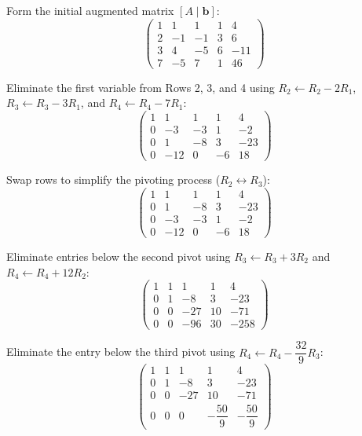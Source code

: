 \documentclass[12pt,a3paper]{article}
\begin{document}
\begin{tcolorbox}[enhanced,breakable,
  colback=cB!4,colframe=cB,boxrule=0.8pt,arc=5pt,
  title={\textbf{Answer --- Solve System via Augmented Matrix}},
  fonttitle=\bfseries\color{white},colbacktitle=cB]

Form the initial augmented matrix $[A \mid \mathbf{b}]$:
\[
\left(\begin{array}{rrrr|r}
1 & 1 & 1 & 1 & 4\\
2 & -1 & -1 & 3 & 6\\
3 & 4 & -5 & 6 & -11\\
7 & -5 & 7 & 1 & 46
\end{array}\right)
\]

Eliminate the first variable from Rows 2, 3, and 4 using $R_2 \leftarrow R_2 - 2R_1$, $R_3 \leftarrow R_3 - 3R_1$, and $R_4 \leftarrow R_4 - 7R_1$:
\[
\left(\begin{array}{rrrr|r}
1 & 1 & 1 & 1 & 4\\
0 & -3 & -3 & 1 & -2\\
0 & 1 & -8 & 3 & -23\\
0 & -12 & 0 & -6 & 18
\end{array}\right)
\]

Swap rows to simplify the pivoting process ($R_2 \leftrightarrow R_3$):
\[
\left(\begin{array}{rrrr|r}
1 & 1 & 1 & 1 & 4\\
0 & 1 & -8 & 3 & -23\\
0 & -3 & -3 & 1 & -2\\
0 & -12 & 0 & -6 & 18
\end{array}\right)
\]

Eliminate entries below the second pivot using $R_3 \leftarrow R_3 + 3R_2$ and $R_4 \leftarrow R_4 + 12R_2$:
\[
\left(\begin{array}{rrrr|r}
1 & 1 & 1 & 1 & 4\\
0 & 1 & -8 & 3 & -23\\
0 & 0 & -27 & 10 & -71\\
0 & 0 & -96 & 30 & -258
\end{array}\right)
\]

Eliminate the entry below the third pivot using $R_4 \leftarrow R_4 - \dfrac{32}{9}R_3$:
\[
\left(\begin{array}{rrrr|r}
1 & 1 & 1 & 1 & 4\\
0 & 1 & -8 & 3 & -23\\
0 & 0 & -27 & 10 & -71\\
0 & 0 & 0 & -\dfrac{50}{9} & -\dfrac{50}{9}
\end{array}\right)
\]


\end{tcolorbox}
\end{document}
